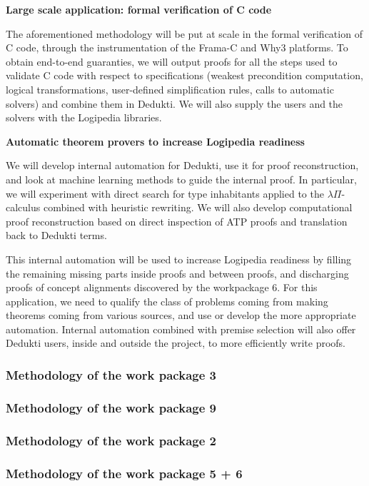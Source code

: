 {\bf \large Large scale application: formal verification of C code}

The aforementioned methodology will be put at scale in the formal
verification of C code, through the instrumentation of the Frama-C and
Why3 platforms. To obtain end-to-end guaranties, we will output proofs
for all the steps used to validate C code with respect to specifications
(weakest precondition computation, logical transformations, user-defined
simplification rules, calls to automatic solvers) and combine them in
Dedukti. We will also supply the users and the solvers with the
Logipedia libraries.


{\bf \large Automatic theorem provers to increase Logipedia readiness}

We will develop internal automation for Dedukti, use it for proof
reconstruction, and look at machine learning methods to guide the
internal proof. In particular, we will experiment with direct search for
type inhabitants applied to the $\lambda\Pi$-calculus combined with
heuristic rewriting. We will also develop computational proof
reconstruction based on direct inspection of ATP proofs and translation
back to Dedukti terms.

This internal automation will be used to increase Logipedia readiness by
filling the remaining missing parts inside proofs and between proofs,
and discharging proofs of concept alignments discovered by the
workpackage 6. For this application, we need to qualify the class of
problems coming from making theorems coming from various sources, and
use or develop the more appropriate automation. Internal automation
combined with premise selection will also offer Dedukti users, inside
and outside the project, to more efficiently write proofs.


\subsubsection{Methodology of the work package 3}

\subsubsection{Methodology of the work package 9}

\subsubsection{Methodology of the work package 2}

\subsubsection{Methodology of the work package 5 + 6}

